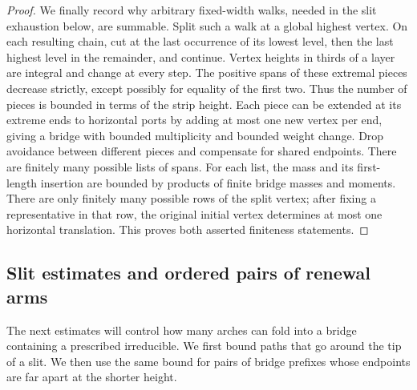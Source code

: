 \begin{proof}
We finally record why arbitrary fixed-width walks, needed in the slit
exhaustion below, are summable. Split such a walk at a global highest
vertex. On each resulting chain, cut at the last occurrence of its
lowest level, then the last highest level in the remainder, and continue.
Vertex heights in thirds of a layer are integral and change at every
step. The positive spans of these extremal pieces decrease strictly,
except possibly for equality of the first two. Thus the number of pieces
is bounded in terms of the strip height. Each piece can be extended at
its extreme ends to horizontal ports by adding at most one new vertex
per end, giving a bridge with bounded multiplicity and bounded weight
change. Drop avoidance between different pieces and compensate for shared
endpoints. There are finitely many possible lists of spans. For each list,
the mass and its first-length insertion are bounded by products of finite
bridge masses and moments. There are only finitely many possible rows of
the split vertex; after fixing a representative in that row, the original
initial vertex determines at most one horizontal translation. This proves
both asserted finiteness statements.
\end{proof}

\subsection{Slit estimates and ordered pairs of renewal arms}

The next estimates will control how many arches can fold into a bridge
containing a prescribed irreducible. We first bound paths that go around
the tip of a slit. We then use the same bound for pairs of bridge prefixes
whose endpoints are far apart at the shorter height.

